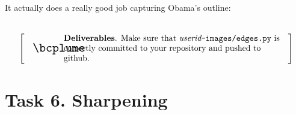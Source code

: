 \documentclass[titlepage]{tufte-book}
\makeatletter
\newenvironment{callout}[1]{
\[
  \left[
      \begin{tabular}{@{\quad}m{.05\textwidth}@{\qquad}m{.75\textwidth}@{\quad}}
        \scalebox{1.5}{#1} & 
          \raggedright%
}
{
      \end{tabular}
    \right]
\]
}
\makeatother
\begin{document}
It actually does a really good job capturing Obama's outline:\\
~\\

\begin{minipage}{\linewidth}
\end{minipage}

\begin{callout}{\bcplume}
{\bf Deliverables}. Make sure that {\em userid}{\tt -images/edges.py} is correctly committed to your repository and pushed to github. 
\end{callout}

\section{Task 6. Sharpening}
\end{document}
